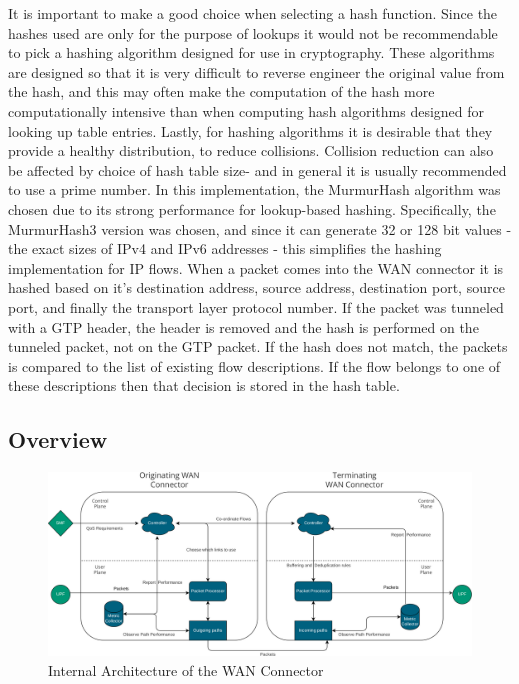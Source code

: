 It is important to make a good choice when selecting a hash function. Since the hashes used are only for the purpose of lookups it would not be recommendable to pick a hashing algorithm designed for use in cryptography. These algorithms are designed so that it is very difficult to reverse engineer the original value from the hash, and this may often make the computation of the hash more computationally intensive than when computing hash algorithms designed for looking up table entries. Lastly, for hashing algorithms it is desirable that they provide a healthy distribution, to reduce collisions. Collision reduction can also be affected by choice of hash table size- and in general it is usually recommended to use a prime number. In this implementation, the MurmurHash algorithm was chosen due to its strong performance for lookup-based hashing. Specifically, the MurmurHash3 \cite{murmurhash3} version was chosen, and since it can generate 32 or 128 bit values - the exact sizes of IPv4 and IPv6 addresses - this simplifies the hashing implementation for IP flows. When a packet comes into the WAN connector it is hashed based on it's destination address, source address, destination port, source port, and finally the transport layer protocol number. If the packet was tunneled with a GTP header, the header is removed and the hash is performed on the tunneled packet, not on the GTP packet. If the hash does not match, the packets is compared to the list of existing flow descriptions. If the flow belongs to one of these descriptions then that decision is stored in the hash table.

\subsection{Overview}

\begin{figure}[h]
    \centering
        \includegraphics[width=\textwidth]{fig/be-architecture.png}
        \caption{Internal Architecture of the WAN Connector}
        \label{fig:arch}
\end{figure}

